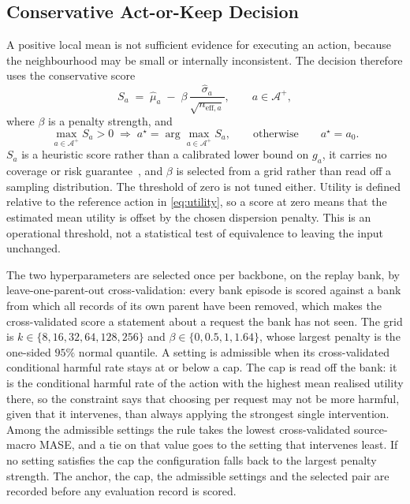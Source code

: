 \documentclass{article}
\newcommand{\calA}{\mathcal{A}}
\begin{document}
\subsection{Conservative Act-or-Keep Decision}
\label{sec:method-decision}
A positive local mean is not sufficient evidence for executing an action, because the
neighbourhood may be small or internally inconsistent. The decision therefore uses the
conservative score
\begin{equation}
  S_a \;=\; \hat\mu_a \;-\; \beta\, \frac{\hat\sigma_a}{\sqrt{n_{\mathrm{eff},a}}},
  \qquad a \in \calA^{+},
  \label{eq:score}
\end{equation}
where $\beta$ is a penalty strength, and
\begin{equation}
  \max_{a \in \calA^{+}} S_a > 0
  \;\Rightarrow\;
  a^{\star} = \arg\max_{a \in \calA^{+}} S_a ,
  \qquad\text{otherwise}\qquad
  a^{\star} = a_0 .
  \label{eq:decision}
\end{equation}
$S_a$ is a heuristic score rather than a calibrated lower bound on $g_a$, it carries no
coverage or risk guarantee~\citep{angelopoulos2024conformal}, and $\beta$ is selected from a
grid rather than read off a sampling distribution. The threshold of zero is not tuned either.
Utility is defined relative to the reference action in \eqref{eq:utility}, so a score at zero
means that the estimated mean utility is offset by the chosen dispersion penalty. This is
an operational threshold, not a statistical test of equivalence to leaving the input unchanged.

The two hyperparameters are selected once per backbone, on the replay bank, by
leave-one-parent-out cross-validation: every bank episode is scored against a bank from which
all records of its own parent have been removed, which makes the cross-validated score a
statement about a request the bank has not seen. The grid is
$k \in \{8, 16, 32, 64, 128, 256\}$ and $\beta \in \{0, 0.5, 1, 1.64\}$, whose largest penalty
is the one-sided $95\%$ normal quantile. A setting is admissible when its cross-validated
conditional harmful rate stays at or below a cap. The cap is read off the bank: it is the
conditional harmful rate of the action with the highest mean realised utility there, so the
constraint says that choosing per request may not be more harmful, given that it intervenes,
than always applying the strongest single intervention. Among the admissible settings the rule
takes the lowest cross-validated source-macro MASE, and a tie on that value goes to the setting
that intervenes least. If no setting satisfies the cap the configuration falls back to the
largest penalty strength. The anchor, the cap, the admissible settings and the selected pair
are recorded before any evaluation record is scored.
\end{document}
